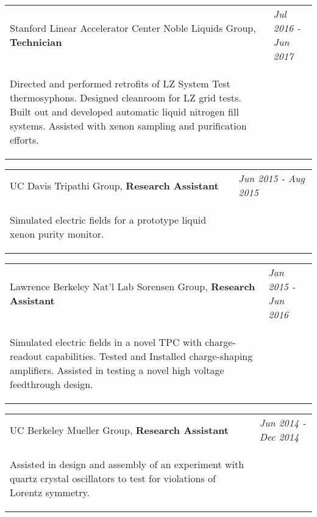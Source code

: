 \documentclass[
  10pt,
  letterpaper,
  DIV=11,
  numbers=noendperiod]{scrartcl}
\begin{document}
\begin{tabularx}{\textwidth}{>{\RaggedRight}p{}  >{\RaggedLeft}X} Stanford Linear Accelerator Center Noble Liquids Group, \textbf{Technician} & \textcolor{mygray}{\textit{Jul 2016 - Jun 2017}} \\ \begin{quoting} \vspace{-0.7\baselineskip} Directed and performed retrofits of LZ System Test thermosyphons. Designed cleanroom for LZ grid tests. Built out and developed automatic liquid nitrogen fill systems. Assisted with xenon sampling and purification efforts. \vspace{-\baselineskip} \end{quoting} \end{tabularx}

\begin{tabularx}{\textwidth}{>{\RaggedRight}p{}  >{\RaggedLeft}X} UC Davis Tripathi Group, \textbf{Research Assistant} & \textcolor{mygray}{\textit{Jun 2015 - Aug 2015}} \\ \begin{quoting} \vspace{-0.7\baselineskip} Simulated electric fields for a prototype liquid xenon purity monitor. \vspace{-\baselineskip} \end{quoting} \end{tabularx}

\begin{tabularx}{\textwidth}{>{\RaggedRight}p{}  >{\RaggedLeft}X} Lawrence Berkeley Nat'l Lab Sorensen Group, \textbf{Research Assistant} & \textcolor{mygray}{\textit{Jan 2015 - Jun 2016}} \\ \begin{quoting} \vspace{-0.7\baselineskip} Simulated electric fields in a novel TPC with charge-readout capabilities. Tested and Installed charge-shaping amplifiers. Assisted in testing a novel high voltage feedthrough design. \vspace{-\baselineskip} \end{quoting} \end{tabularx}

\begin{tabularx}{\textwidth}{>{\RaggedRight}p{}  >{\RaggedLeft}X} UC Berkeley Mueller Group, \textbf{Research Assistant} & \textcolor{mygray}{\textit{Jun 2014 - Dec 2014}} \\ \begin{quoting} \vspace{-0.7\baselineskip} Assisted in design and assembly of an experiment with quartz crystal oscillators to test for violations of Lorentz symmetry. \vspace{-\baselineskip} \end{quoting} \end{tabularx}
\end{document}
